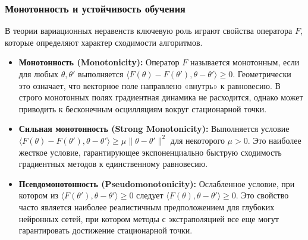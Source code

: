 \documentclass[12pt,a4paper]{article}
\begin{document}
	\subsubsection{Монотонность и устойчивость обучения}
	В теории вариационных неравенств ключевую роль играют свойства оператора $F$, которые определяют характер сходимости алгоритмов.
	\begin{itemize}
		\item \textbf{Монотонность (Monotonicity):} Оператор $F$ называется монотонным, если для любых $\theta, \theta'$ выполняется $\langle F(\theta) - F(\theta'), \theta - \theta' \rangle \ge 0$. Геометрически это означает, что векторное поле направлено «внутрь» к равновесию. В строго монотонных полях градиентная динамика не расходится, однако может приводить к бесконечным осцилляциям вокруг стационарной точки.
		\item \textbf{Сильная монотонность (Strong Monotonicity):} Выполняется условие $\langle F(\theta) - F(\theta'), \theta - \theta' \rangle \ge \mu \|\theta - \theta'\|^2$ для некоторого $\mu > 0$. Это наиболее жесткое условие, гарантирующее экспоненциально быструю сходимость градиентных методов к единственному равновесию.
		\item \textbf{Псевдомонотонность (Pseudomonotonicity):} Ослабленное условие, при котором из $\langle F(\theta'), \theta - \theta' \rangle \ge 0$ следует $\langle F(\theta), \theta - \theta' \rangle \ge 0$. Это свойство часто является наиболее реалистичным предположением для глубоких нейронных сетей, при котором методы с экстраполяцией все еще могут гарантировать достижение стационарной точки.
	\end{itemize}
	
\end{document}

